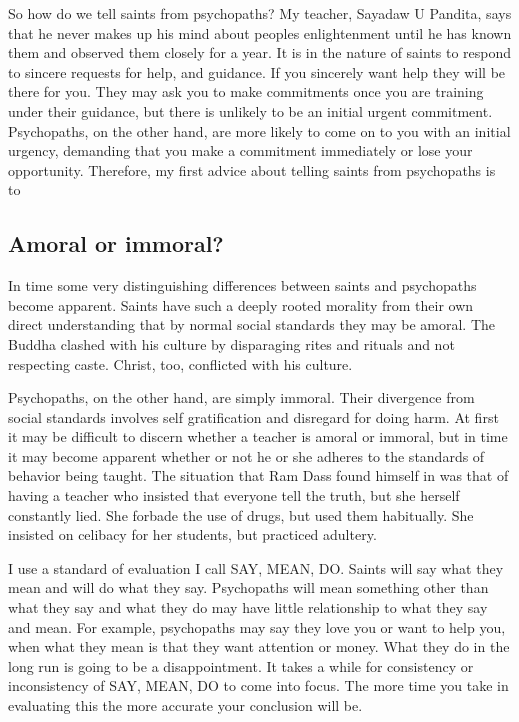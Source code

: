 \documentclass[a5paper,10pt,english]{book}
\begin{document}
\sphinxAtStartPar
So how do we tell saints from psychopaths? My teacher, Sayadaw U
Pandita, says that he never makes up his mind about peoples
enlightenment until he has known them and observed them closely for a
year. It is in the nature of saints to respond to sincere requests for
help, and guidance. If you sincerely want help they will be there for
you. They may ask you to make commitments once you are training under
their guidance, but there is unlikely to be an initial urgent
commitment. Psychopaths, on the other hand, are more likely to come on
to you with an initial urgency, demanding that you make a commitment
immediately or lose your opportunity. Therefore, my first advice about
telling saints from psychopaths is to 


\subsection{Amoral or immoral?}
\label{\detokenize{psychopaths:amoral-or-immoral}}
\sphinxAtStartPar
In time some very distinguishing differences between saints and
psychopaths become apparent. Saints have such a deeply rooted morality
from their own direct understanding that by normal social standards they
may be amoral. The Buddha clashed with his culture by disparaging rites
and rituals and not respecting caste. Christ, too, conflicted with his
culture.

\sphinxAtStartPar
Psychopaths, on the other hand, are simply immoral. Their divergence
from social standards involves self gratification and disregard for
doing harm. At first it may be difficult to discern whether a teacher is
amoral or immoral, but in time it may become apparent whether or not he
or she adheres to the standards of behavior being taught. The situation
that Ram Dass found himself in was that of having a teacher who insisted
that everyone tell the truth, but she herself constantly lied. She
forbade the use of drugs, but used them habitually. She insisted on
celibacy for her students, but practiced adultery.

\sphinxAtStartPar
I use a standard of evaluation I call SAY, MEAN, DO. Saints will say
what they mean and will do what they say. Psychopaths will mean
something other than what they say and what they do may have little
relationship to what they say and mean. For example, psychopaths may say
they love you or want to help you, when what they mean is that they want
attention or money. What they do in the long run is going to be a
disappointment. It takes a while for consistency or inconsistency of
SAY, MEAN, DO to come into focus. The more time you take in evaluating
this the more accurate your conclusion will be.
\end{document}
